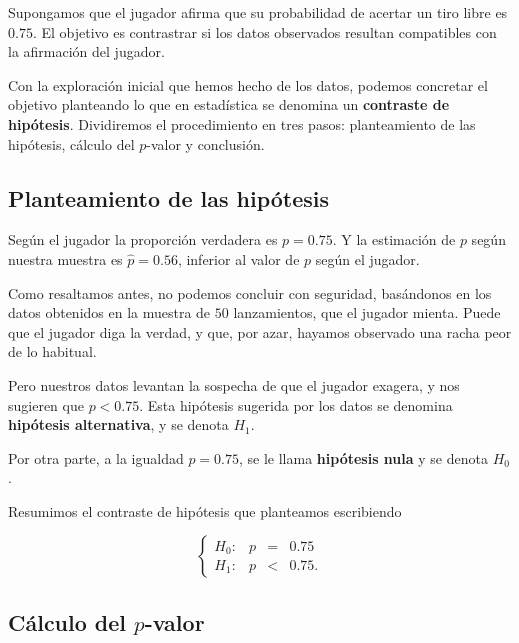 \documentclass[
  notoc,
  nobib,
  degree=mec]{mnye}
\begin{document}
\begin{ebox}{}
Supongamos que el jugador afirma que su probabilidad de acertar un tiro libre es \(0.75\). El objetivo es contrastrar si los datos observados resultan compatibles con la afirmación del jugador.

\end{ebox}

Con la exploración inicial que hemos hecho de los datos, podemos concretar el objetivo planteando lo que en estadística se denomina un \textbf{contraste de hipótesis}. Dividiremos el procedimiento en tres pasos: planteamiento de las hipótesis, cálculo del \(p\)-valor y conclusión.

\hypertarget{planteamiento-de-las-hipuxf3tesis}{%
\subsection{Planteamiento de las hipótesis}\label{planteamiento-de-las-hipuxf3tesis}}

Según el jugador la proporción verdadera es \(p=0.75\). Y la estimación de \(p\) según nuestra muestra es \(\widehat{p}=0.56\), inferior al valor de \(p\) según el jugador.

Como resaltamos antes, no podemos concluir con seguridad, basándonos en los datos obtenidos en la muestra de \(50\) lanzamientos, que el jugador mienta. Puede que el jugador diga la verdad, y que, por azar, hayamos observado una racha peor de lo habitual.

Pero nuestros datos levantan la sospecha de que el jugador exagera, y nos sugieren que \(p<0.75\). Esta hipótesis sugerida por los datos se denomina \textbf{hipótesis alternativa}, y se denota \(H_1\).

Por otra parte, a la igualdad \(p=0.75\), se le llama \textbf{hipótesis nula} y se denota \(H_0\).

Resumimos el contraste de hipótesis que planteamos escribiendo

\[
  \left\{
  \begin{array}{lrcl}
    H_0:&p&=&0.75\\
    H_1:&p&<&0.75.
  \end{array}
  \right.
\]

\hypertarget{cuxe1lculo-del-p-valor}{%
\subsection{\texorpdfstring{Cálculo del \(p\)-valor}{Cálculo del p-valor}}\label{cuxe1lculo-del-p-valor}}
\end{document}
